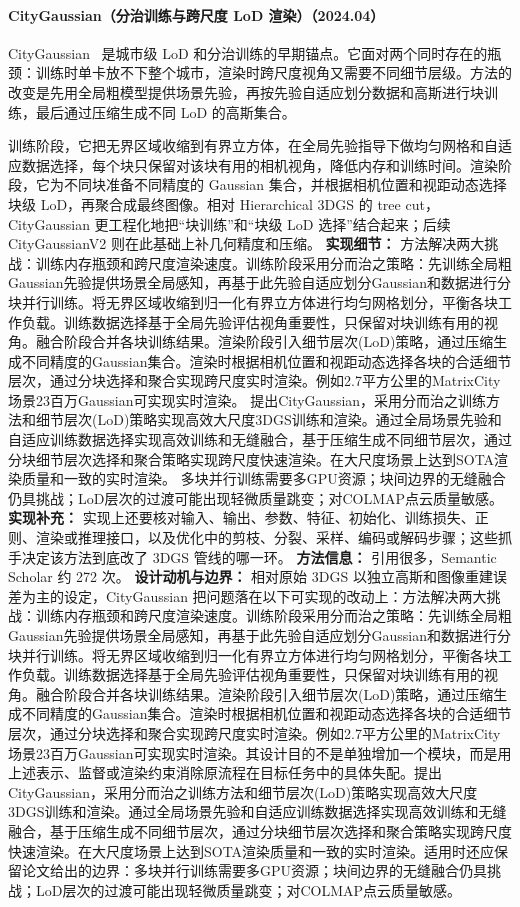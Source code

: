 \paragraph{CityGaussian（分治训练与跨尺度 LoD 渲染）（2024.04）}
CityGaussian~\cite{2404_01133} 是城市级 LoD 和分治训练的早期锚点。它面对两个同时存在的瓶颈：训练时单卡放不下整个城市，渲染时跨尺度视角又需要不同细节层级。方法的改变是先用全局粗模型提供场景先验，再按先验自适应划分数据和高斯进行块训练，最后通过压缩生成不同 LoD 的高斯集合。

训练阶段，它把无界区域收缩到有界立方体，在全局先验指导下做均匀网格和自适应数据选择，每个块只保留对该块有用的相机视角，降低内存和训练时间。渲染阶段，它为不同块准备不同精度的 Gaussian 集合，并根据相机位置和视距动态选择块级 LoD，再聚合成最终图像。相对 Hierarchical 3DGS 的 tree cut，CityGaussian 更工程化地把“块训练”和“块级 LoD 选择”结合起来；后续 CityGaussianV2 则在此基础上补几何精度和压缩。
\textbf{实现细节：} 方法解决两大挑战：训练内存瓶颈和跨尺度渲染速度。训练阶段采用分而治之策略：先训练全局粗Gaussian先验提供场景全局感知，再基于此先验自适应划分Gaussian和数据进行分块并行训练。将无界区域收缩到归一化有界立方体进行均匀网格划分，平衡各块工作负载。训练数据选择基于全局先验评估视角重要性，只保留对块训练有用的视角。融合阶段合并各块训练结果。渲染阶段引入细节层次(LoD)策略，通过压缩生成不同精度的Gaussian集合。渲染时根据相机位置和视距动态选择各块的合适细节层次，通过分块选择和聚合实现跨尺度实时渲染。例如2.7平方公里的MatrixCity场景23百万Gaussian可实现实时渲染。 提出CityGaussian，采用分而治之训练方法和细节层次(LoD)策略实现高效大尺度3DGS训练和渲染。通过全局场景先验和自适应训练数据选择实现高效训练和无缝融合，基于压缩生成不同细节层次，通过分块细节层次选择和聚合策略实现跨尺度快速渲染。在大尺度场景上达到SOTA渲染质量和一致的实时渲染。 多块并行训练需要多GPU资源；块间边界的无缝融合仍具挑战；LoD层次的过渡可能出现轻微质量跳变；对COLMAP点云质量敏感。
\textbf{实现补充：} 实现上还要核对输入、输出、参数、特征、初始化、训练损失、正则、渲染或推理接口，以及优化中的剪枝、分裂、采样、编码或解码步骤；这些抓手决定该方法到底改了 3DGS 管线的哪一环。
\textbf{方法信息：} 引用很多，Semantic Scholar 约 272 次。
\textbf{设计动机与边界：} 相对原始 3DGS 以独立高斯和图像重建误差为主的设定，CityGaussian 把问题落在以下可实现的改动上：方法解决两大挑战：训练内存瓶颈和跨尺度渲染速度。训练阶段采用分而治之策略：先训练全局粗Gaussian先验提供场景全局感知，再基于此先验自适应划分Gaussian和数据进行分块并行训练。将无界区域收缩到归一化有界立方体进行均匀网格划分，平衡各块工作负载。训练数据选择基于全局先验评估视角重要性，只保留对块训练有用的视角。融合阶段合并各块训练结果。渲染阶段引入细节层次(LoD)策略，通过压缩生成不同精度的Gaussian集合。渲染时根据相机位置和视距动态选择各块的合适细节层次，通过分块选择和聚合实现跨尺度实时渲染。例如2.7平方公里的MatrixCity场景23百万Gaussian可实现实时渲染。其设计目的不是单独增加一个模块，而是用上述表示、监督或渲染约束消除原流程在目标任务中的具体失配。提出CityGaussian，采用分而治之训练方法和细节层次(LoD)策略实现高效大尺度3DGS训练和渲染。通过全局场景先验和自适应训练数据选择实现高效训练和无缝融合，基于压缩生成不同细节层次，通过分块细节层次选择和聚合策略实现跨尺度快速渲染。在大尺度场景上达到SOTA渲染质量和一致的实时渲染。适用时还应保留论文给出的边界：多块并行训练需要多GPU资源；块间边界的无缝融合仍具挑战；LoD层次的过渡可能出现轻微质量跳变；对COLMAP点云质量敏感。
